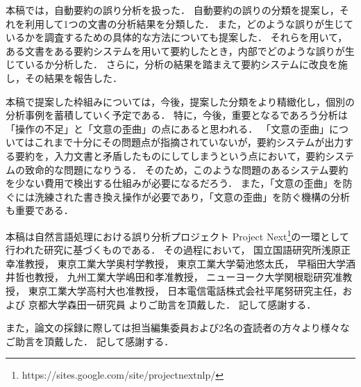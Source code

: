 本稿では，自動要約の誤り分析を扱った．
自動要約の誤りの分類を提案し，それを利用して1つの文書の分析結果を分類した．
また，どのような誤りが生じているかを調査するための具体的な方法についても提案した．
それらを用いて，ある文書をある要約システムを用いて要約したとき，内部でどのような誤りが生じているか分析した．
さらに，分析の結果を踏まえて要約システムに改良を施し，その結果を報告した．

本稿で提案した枠組みについては，今後，提案した分類をより精緻化し，個別の分析事例を蓄積していく予定である．
特に，今後，重要となるであろう分析は「操作の不足」と「文意の歪曲」の点にあると思われる．
「文意の歪曲」についてはこれまで十分にその問題点が指摘されていないが，要約システムが出力する要約を，入力文書と矛盾したものにしてしまうという点において，要約システムの致命的な問題になりうる．
そのため，このような問題のあるシステム要約を少ない費用で検出する仕組みが必要になるだろう．
また，「文意の歪曲」を防ぐには洗練された書き換え操作が必要であり，「文意の歪曲」を防ぐ機構の分析も重要である．

\acknowledgment

本稿は自然言語処理における誤り分析プロジェクト Project Next\footnote{
https://sites.google.com/site/projectnextnlp/}の一環として行われた研究に基づくものである．
その過程において，
国立国語研究所浅原正幸准教授，
東京工業大学奥村学教授，
東京工業大学菊池悠太氏，
早稲田大学酒井哲也教授，
九州工業大学嶋田和孝准教授，
ニューヨーク大学関根聡研究准教授，
東京工業大学高村大也准教授，
日本電信電話株式会社平尾努研究主任，および
京都大学森田一研究員
よりご助言を頂戴した．
記して感謝する．

また，論文の採録に際しては担当編集委員および2名の査読者の方々より様々なご助言を頂戴した．
記して感謝する．

